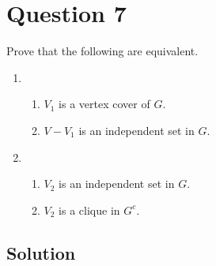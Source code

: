 
\section*{Question 7}
Prove that the following are equivalent.
\begin{enumerate}
  \item 
  \begin{enumerate}
    \item $V_1$ is a vertex cover of $G$.
    \item $V - V_1$ is an independent set in $G$.
  \end{enumerate}
  \item 
  \begin{enumerate}
    \item $V_2$ is an independent set in $G$.
    \item $V_2$ is a clique in $G^c$.
  \end{enumerate}
\end{enumerate}

\subsection*{Solution}

